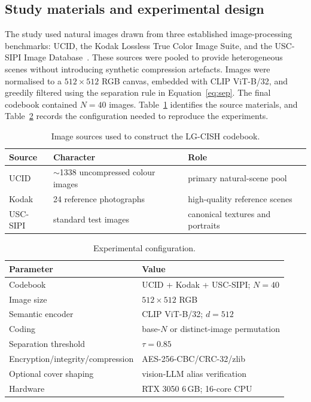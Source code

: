 \documentclass[10pt,a4paper]{article}
\theoremstyle{definition}
\begin{document}
\subsection{Study materials and experimental design}\label{sec:dataset}
The study used natural images drawn from three established image-processing
benchmarks: UCID, the Kodak Lossless True Color Image Suite, and the USC-SIPI
Image Database~\cite{ucid,kodak,uscsipi}. These sources were pooled to provide
heterogeneous scenes without introducing synthetic compression artefacts. Images
were normalised to a $512\times512$ RGB canvas, embedded with CLIP ViT-B/32, and
greedily filtered using the separation rule in Equation~\eqref{eq:sep}. The final
codebook contained $N=40$ images. Table~\ref{tab:datasets} identifies the source
materials, and Table~\ref{tab:setup} records the configuration needed to reproduce
the experiments.

\begin{table}[t]
\centering
\caption{Image sources used to construct the LG-CISH codebook.}\label{tab:datasets}
\begin{tabular}{@{}lll@{}}
\toprule
Source & Character & Role \\
\midrule
UCID & $\sim$1338 uncompressed colour images & primary natural-scene pool \\
Kodak & 24 reference photographs & high-quality reference scenes \\
USC-SIPI & standard test images & canonical textures and portraits \\
\bottomrule
\end{tabular}
\end{table}

\begin{table}[t]
\centering
\caption{Experimental configuration.}\label{tab:setup}
\begin{tabular}{@{}ll@{}}
\toprule
Parameter & Value \\
\midrule
Codebook & UCID + Kodak + USC-SIPI; $N=40$ \\
Image size & $512\times512$ RGB \\
Semantic encoder & CLIP ViT-B/32; $d=512$ \\
Coding & base-$N$ or distinct-image permutation \\
Separation threshold & $\tau=0.85$ \\
Encryption/integrity/compression & AES-256-CBC/CRC-32/zlib \\
Optional cover shaping & vision-LLM alias verification \\
Hardware & RTX 3050 6\,GB; 16-core CPU \\
\bottomrule
\end{tabular}
\end{table}
\end{document}
